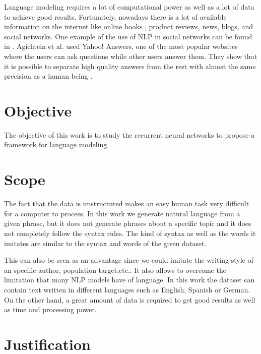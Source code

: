 Language modeling requires a lot of computational power as well as a lot of data to achieve good results. Fortunately, nowadays there is a lot of available information on the internet like online books , product reviews, news, blogs, and social networks. One example of the use of NLP in social networks can be found in   \cite{agichtein2008finding}.  Agichtein et al. used Yahoo! Answers, one of the most popular websites where the users can ask questions while other users answer them. They show that it is possible to separate high quality answers from the rest with almost the same precision as a human being . 


\section{Objective}
The objective of this work is to study the recurrent neural networks to propose a framework for language modeling. 

\section{Scope}
The fact that the data is unstructured makes an easy human task  very difficult for a computer to process. In this work we generate natural language from a given phrase, but it does not generate phrases about a specific topic and it does not completely follow the syntax rules. The kind of syntax as well as the words it imitates are similar to the syntax and words of the given dataset. 

This can also be seen as an advantage since  we could imitate the writing style of an specific author, population target,etc.. It  also allows to overcome the limitation that many NLP models have of language. In this work the dataset can contain text written in different languages such as English, Spanish or German. On the other hand, a great amount of data is required to get good results as well as time and processing power. 

\section{Justification}

